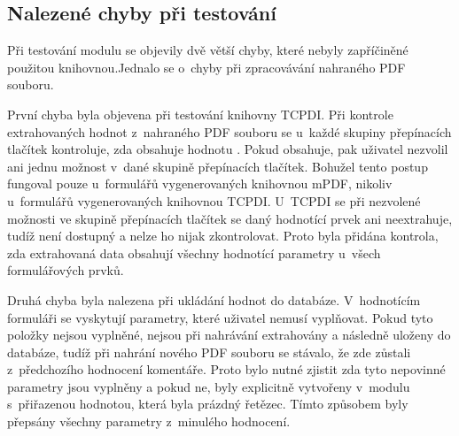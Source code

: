\subsection{Nalezené chyby při testování}
\label{subsec:chyby_pri_testovani}
Při testování modulu se objevily dvě větší chyby, které nebyly zapříčiněné použitou knihovnou.Jednalo se o~chyby při zpracovávání nahraného PDF souboru.
\par
První chyba byla objevena při testování knihovny TCPDI. Při kontrole extrahovaných hodnot z~nahraného PDF souboru se u~každé skupiny přepínacích tlačítek kontroluje, zda obsahuje hodnotu . Pokud obsahuje, pak uživatel nezvolil ani jednu možnost v~dané skupině přepínacích tlačítek. Bohužel tento postup fungoval pouze u~formulářů vygenerovaných knihovnou mPDF, nikoliv u~formulářů vygenerovaných knihovnou TCPDI. U~TCPDI se při nezvolené možnosti ve skupině přepínacích tlačítek se daný hodnotící prvek ani neextrahuje, tudíž není dostupný a nelze ho nijak zkontrolovat. Proto byla přidána kontrola, zda extrahovaná data obsahují všechny hodnotící parametry u~všech formulářových prvků.
\par
Druhá chyba byla nalezena při ukládání hodnot do databáze. V~hodnotícím formuláři se vyskytují parametry, které uživatel nemusí vyplňovat. Pokud tyto položky nejsou vyplněné, nejsou při nahrávání extrahovány a následně uloženy do databáze, tudíž při nahrání nového PDF souboru se stávalo, že zde zůstali z~předchozího hodnocení komentáře. Proto bylo nutné zjistit zda tyto nepovinné parametry jsou vyplněny a pokud ne, byly explicitně vytvořeny v~modulu s~přiřazenou hodnotou, která byla prázdný řetězec. Tímto způsobem byly přepsány všechny parametry z~minulého hodnocení.

